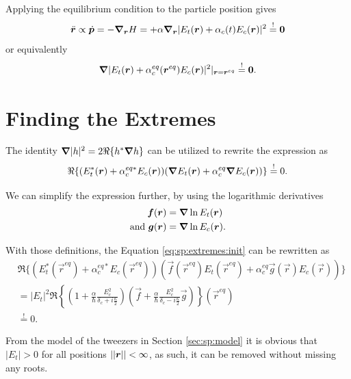 Applying the equilibrium condition to the particle position gives
\begin{equation}
    \ddot{\bm{r}} \propto \dot{\bm{p}} = -\bm{\nabla}_{\bm{r}}{H}
        = +\alpha \bm{\nabla}_{\bm{r}} |E_t(\bm{r}) + \alpha_c(t) E_c(\bm{r})|^2 \overset{!}{=} \bm{0}
\end{equation}
or equivalently
\begin{equation} 
        \bm{\nabla}
            |E_t(\bm{r}) + \alpha_c^{eq}(\bm{r}^{eq}) E_c(\bm{r})|^2 |_{\bm{r} = \bm{r}^{eq}} 
            \overset{!}{=} \bm{0}.
\end{equation}


\section{Finding the Extremes}
\label{sec:sp:extrem}

The identity $\bm{\nabla} |h|^2 = 2 \Re\{ h^* \bm{\nabla} h \}$
    can be utilized to rewrite the expression as
\begin{equation}
\label{eq:sp:extremes:init}
    \Re\{ (E_t^*(\bm{r}) + \alpha_c^{eq*} E_c(\bm{r}))
        (\bm{\nabla} E_t(\bm{r}) + \alpha_c^{eq} \bm{\nabla} E_c(\bm{r}))  \} \overset{!}{=}0.
\end{equation}

We can simplify the expression further, 
    by using the logarithmic derivatives
\begin{align}
    \bm{f}(\bm{r}) &= \bm{\nabla} \ln E_t(\bm{r}) \\
    \text{and }\bm{g}(\bm{r}) &= \bm{\nabla} \ln E_c(\bm{r}).
\end{align}

With those definitions, the Equation \eqref{eq:sp:extremes:init} can be rewritten as
\begin{align}
    &\Re\{ \left(E_t^*(\vec r^{eq}) + \alpha_c^{eq*} E_c(\vec r^{eq})\right)
        (\vec f(\vec r^{eq})E_t(\vec r^{eq}) + \alpha_c^{eq} \vec g(\vec r) E_c(\vec r))  \} \\
    &= |E_t|^2 \Re\left\{ \left(1 + 
            \frac{\alpha}{\hbar} \frac{ E_c^2}{\delta_c + i \frac{\kappa}{2}} \right)
        \left(\vec f +  
            \frac{\alpha}{\hbar} \frac{E_c^2}{\delta_c - i \frac{\kappa}{2}}
            \vec g \right)  \right\}(\vec r^{eq})  \\
    &\overset{!}{=}0.
\end{align}

From the model of the tweezers in  Section \ref{sec:sp:model} it is obvious that $|E_t|>0$ for all positions $||\bm{r}|| < \infty$,
    as such, it can be removed without missing any roots.

